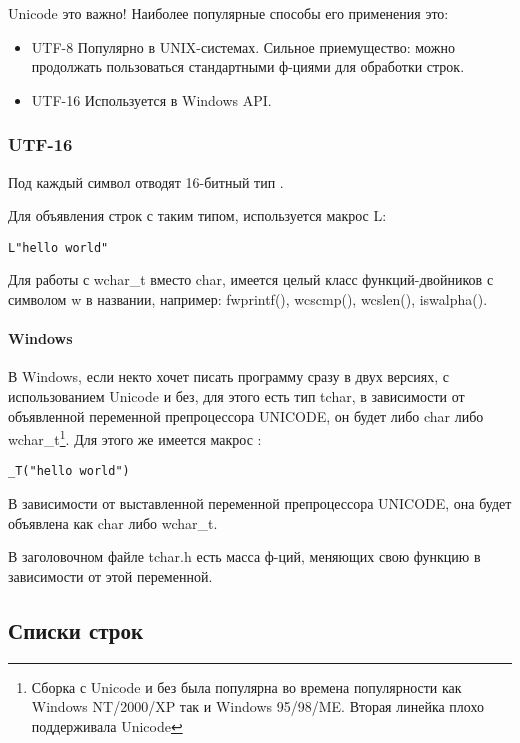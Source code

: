 Unicode это важно! Наиболее популярные способы его применения это:

\begin{itemize}
\item UTF-8
Популярно в UNIX-системах. Сильное приемущество: можно продолжать пользоваться стандартными ф-циями для
обработки строк.

\item UTF-16
Используется в Windows API.
\end{itemize}

\subsubsection{UTF-16}

Под каждый символ отводят 16-битный тип .

Для объявления строк с таким типом, используется макрос L:

\begin{lstlisting}
L"hello world"
\end{lstlisting}

Для работы с wchar\_t вместо char, имеется целый класс функций-двойников с символом w в названии,
например: fwprintf(), wcscmp(), wcslen(), iswalpha().

\paragraph{Windows}

В Windows, если некто хочет писать программу сразу в двух версиях, с использованием Unicode и без,
для этого есть тип tchar, в зависимости от объявленной переменной препроцессора UNICODE, 
он будет либо char либо wchar\_t\footnote{Сборка с Unicode и без была популярна во времена популярности
как Windows NT/2000/XP так и Windows 95/98/ME. Вторая линейка плохо поддерживала Unicode}.
Для этого же имеется макрос :

\begin{lstlisting}
_T("hello world")
\end{lstlisting}

В зависимости от выставленной переменной препроцессора UNICODE, она будет объявлена как char либо wchar\_t.

В заголовочном файле tchar.h есть масса ф-ций, меняющих свою функцию в зависимости от этой переменной.

\subsection{Списки строк}

